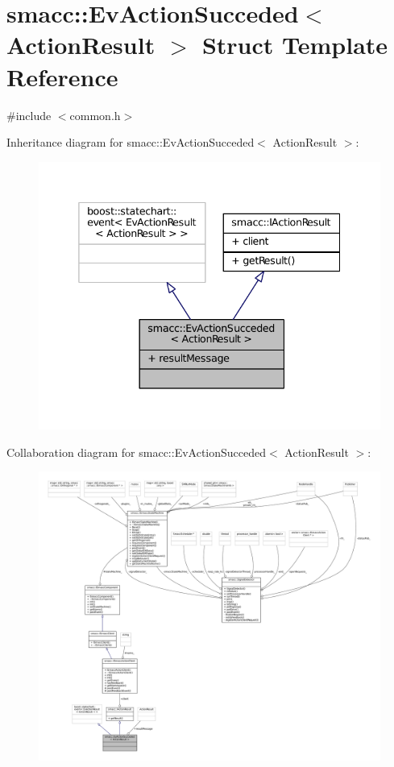 \hypertarget{structsmacc_1_1EvActionSucceded}{}\section{smacc\+:\+:Ev\+Action\+Succeded$<$ Action\+Result $>$ Struct Template Reference}
\label{structsmacc_1_1EvActionSucceded}


{\ttfamily \#include $<$common.\+h$>$}



Inheritance diagram for smacc\+:\+:Ev\+Action\+Succeded$<$ Action\+Result $>$\+:
\nopagebreak
\begin{figure}[H]
\begin{center}
\leavevmode
\includegraphics[width=338pt]{structsmacc_1_1EvActionSucceded__inherit__graph}
\end{center}
\end{figure}


Collaboration diagram for smacc\+:\+:Ev\+Action\+Succeded$<$ Action\+Result $>$\+:
\nopagebreak
\begin{figure}[H]
\begin{center}
\leavevmode
\includegraphics[width=350pt]{structsmacc_1_1EvActionSucceded__coll__graph}
\end{center}
\end{figure}
